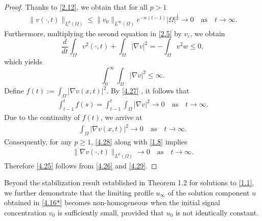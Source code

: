 \documentclass[12pt]{article}
\theoremstyle{plain}
\theoremstyle{definition}
\numberwithin{equation}{section}
\begin{document}
\begin{proof}
Thanks to \eqref{2.12}, we obtain that for all $p>1$
\begin{align}\label{4.26}
    \|v(\cdot,t)\|_{L^{p}(\Omega)}\leq \|v_0\|_{L^\infty(\Omega)}e^{-\kappa (t-1)}|\Omega|^{\frac1 p} %
    \rightarrow 0 \quad \text{as} \quad t \to \infty.
\end{align}
Furthermore, multiplying the second equation in \eqref{2.5} by $v_{\varepsilon}$, we obtain
\begin{equation*}
\frac d{dt}\int_\Omega v^2(\cdot,t)+\int_\Omega |\nabla v|^2=-\int_\Omega v^2w\leq0,
\end{equation*}
which yields
\begin{equation}\label{4.27}
\int_0^{\infty}\int_\Omega|\nabla v|^2\leq\infty.
\end{equation}
Define $f(t) := \int_{\Omega}|\nabla v(x,t)|^2 $. By \eqref{4.27} , it follows that
\begin{align*}
\int_{t-1}^{t} f(s) = \int_{t-1}^{t} \int_\Omega |\nabla v|^2 \rightarrow 0 \quad \text{as} \quad t \to \infty.
\end{align*}
Due to the continuity of $f(t)$, we arrive at
\begin{align}\label{4.28}
\int_{\Omega}|\nabla v(x,t)|^2\rightarrow 0 \quad \text{as} \quad t \to \infty.
\end{align}
Consequently, for any $p \geq 1$, \eqref{4.28} along with \eqref{1.8}  implies
\begin{align}\label{4.29}
\|\nabla v(\cdot,t)\|_{L^p(\Omega)} \to 0 \quad \text{as} \quad t \to \infty.
\end{align}
Therefore \eqref{4.25} follows from \eqref{4.26} and \eqref{4.29}.
\end{proof}

  Beyond the stabilization  result established in Theorem 1.2 for solutions to
   \eqref{1.1}, we further demonstrate that  the  limiting  profile $u_{\infty}$ of the solution component $u$  obtained in \eqref{4.16*} becomes non-homogeneous  when the initial signal concentration $v_0$ is sufficiently small, provided that $u_0$ is not identically constant.
\end{document}
